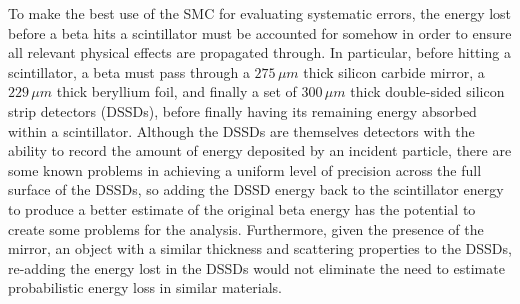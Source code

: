 To make the best use of the SMC for evaluating systematic errors, the energy lost before a beta hits a scintillator must be accounted for somehow in order to ensure all relevant physical effects are propagated through.  In particular, before hitting a scintillator, a beta must pass through a $275\,\mu m$ thick silicon carbide mirror, a $229\,\mu m$ thick beryllium foil, %
and finally a set of $300\,\mu m$ thick double-sided silicon strip detectors (DSSDs), before finally having its remaining energy absorbed within a scintillator.  Although the DSSDs are themselves detectors with the ability to record the amount of energy deposited by an incident particle, there are some known problems in achieving a uniform level of precision across the full surface of the DSSDs, so adding the DSSD energy back to the scintillator energy to produce a better estimate of the original beta energy has the potential to create some problems for the analysis.  Furthermore, given the presence of the mirror, an object with a similar thickness and scattering properties to the DSSDs, re-adding the energy lost in the DSSDs would not eliminate the need to estimate probabilistic energy loss in similar materials.  

